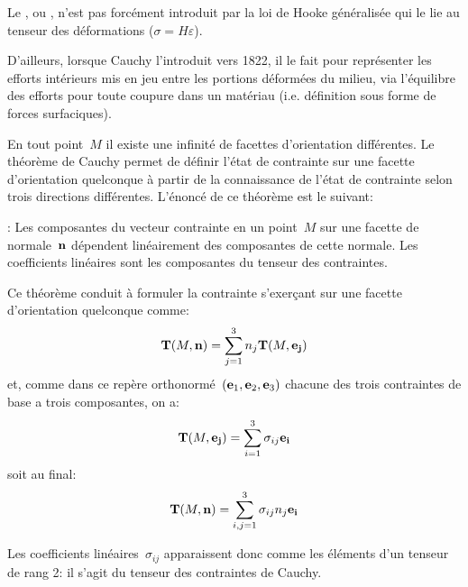 \begin{histoire}%
\ifVersionDuDocEstVincent{}\selectfont\fi
Le , ou , n'est pas forcément introduit par la loi de Hooke généralisée qui le lie au tenseur des déformations ($\sigma=H\varepsilon$).

\medskip
D'ailleurs, lorsque Cauchy l'introduit vers 1822, il le fait pour représenter les efforts intérieurs mis en jeu entre les portions déformées du milieu, via l'équilibre des efforts pour toute coupure
dans un matériau (i.e. définition sous forme de forces surfaciques).

\medskip
En tout point~$M$ il existe une infinité de facettes d'orientation différentes.
 Le théorème de Cauchy  permet de définir l'état de contrainte sur une facette d'orientation quelconque à partir de la connaissance de l'état de contrainte selon trois directions différentes. L'énoncé de ce théorème est le suivant:

\begin{theoreme} :
Les composantes du vecteur contrainte en un point~$M$ sur une facette de normale~$\mathbf{n}$ dépendent linéairement des composantes de cette normale. Les coefficients linéaires sont les composantes du tenseur des contraintes.
\end{theoreme}

\medskip{}
Ce théorème conduit à formuler la contrainte s'exerçant sur une facette d'orientation quelconque comme:
\begin{equation}
\mathbf{T}(M,\mathbf{n}) = \displaystyle\sum_{j=1}^3 n_j \mathbf{T}(M,\mathbf{e_j})
\end{equation}
et, comme dans ce repère orthonormé~$(\mathbf{e}_1,\mathbf{e}_2,\mathbf{e}_3)$ chacune des trois contraintes de base a trois composantes, on a:
\begin{equation}
\mathbf{T}(M,\mathbf{e_j}) = \displaystyle\sum_{i=1}^3 \sigma_{ij}\mathbf{e_i}
\end{equation}
soit au final:
\begin{equation}
\mathbf{T}(M,\mathbf{n}) = \displaystyle\sum_{i,j=1}^3 \sigma_{ij}n_j\mathbf{e_i}
\end{equation}

Les coefficients linéaires~$\sigma_{ij}$ apparaissent donc comme les éléments d'un tenseur de rang 2: il s'agit du tenseur des contraintes de Cauchy.
\end{histoire}
